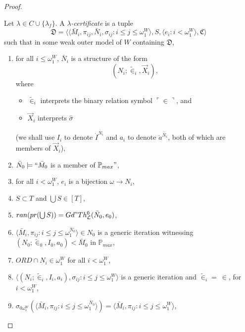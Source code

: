 \documentclass[12pt]{article}
\numberwithin{equation}{section}
\begin{document}
\begin{proof}
\begin{defi}\label{def437}
Let $\lambda \in C \cup \{\lambda_f\}$. A $\lambda$\emph{-certificate} is a tuple 
\begin{equation*}
    \mathfrak{D} = \langle \langle \bar{M}_i, \pi_{ij},  \bar{N}_i, \sigma_{ij} : i \leq j \leq \omega_1^{W} \rangle, S, \langle e_i : i < \omega_1^W \rangle, \mathfrak{C} \rangle
\end{equation*}
such that in some weak outer model of $W$ containing $\mathfrak{D}$,
\begin{enumerate}[label=(C\arabic*)$_{\lambda}$, leftmargin=40pt]
    \item\label{cd0} for all $i \leq \omega_1^W$, $\bar{N}_i$ is a structure of the form
    \begin{equation*}
        (N_i; \tilde{\in}_i, \Vec{X}_i) \text{,}
    \end{equation*}
    where 
    \begin{itemize}
        \item $\tilde{\in}_i$ interprets the binary relation symbol $\ulcorner \in \urcorner$, and
        \item $\Vec{X}_i$ interprets $\hat{\sigma}$ 
    \end{itemize}
    (we shall use $I_i$ to denote $\dot{I}^{\bar{N}_i}$ and $a_i$ to denote $\dot{a}^{\bar{N}_i}$, both of which are members of $\Vec{X}_i$),
    \item\label{cd1} $\bar{N}_0 \models ``\bar{M}_0$ is a member of $\mathbb{P}_{max}"$,
    \item\label{cd1.5} for all $i < \omega_1^W$, $e_i$ is a bijection $\omega \longrightarrow N_i$,
    \item\label{cd2} $S \subset T$ and $\bigcup S \in [T]$,
    \item\label{cd3} $ran(pr(\bigcup S)) = Gd" Th^0_{\mathcal{L}}(\bar{N}_0, e_0)$,
    \item\label{cd4} $\langle \bar{M}_i, \pi_{ij} : i \leq j \leq \omega_1^{\bar{N}_0} \rangle \in N_0$ is a generic iteration witnessing $(N_0; \tilde{\in}_0, I_0, a_0) < \bar{M}_0$ in $\mathbb{P}_{max}$,
    \item\label{cdnew} $ORD \cap N_i \in \omega_1^W$ for all $i < \omega_1^W$,
    \item\label{cd5} $\langle (N_i; \tilde{\in}_i, I_i, a_i), \sigma_{ij} : i \leq  j \leq \omega_1^{W} \rangle$ is a generic iteration and $\tilde{\in}_i = \ \in$, for $i < \omega_1^W$,
    \item\label{cd6} $\sigma_{0\omega_1^W}(\langle \bar{M}_i, \pi_{ij} : i \leq j \leq \omega_1^{\bar{N}_0} \rangle) = \langle \bar{M}_i, \pi_{ij} : i \leq j \leq \omega_1^W \rangle$, 

\end{enumerate}
\end{defi}
\end{proof}
\end{document}
